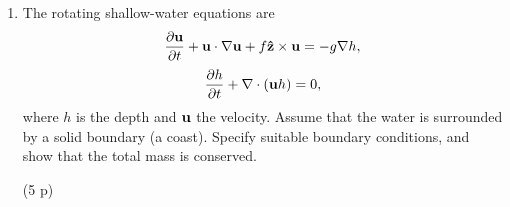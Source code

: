 \documentclass[12pt,a4paper]{article}
\newcommand{\bu}{{\bf u}}
\newcommand{\hz}{{\bf\hat{z}}}
\begin{document}
\begin{enumerate}
(10 p)\\
\item
The rotating shallow-water equations are
$$
\frac{\partial \bu}{\partial t}+\bu\cdot\nabla\bu+f\hz\times\bu
= -g\nabla h,
$$
$$
\frac{\partial h}{\partial t}+\nabla\cdot(\bu h) = 0,
$$
where $h$ is the depth and $\bu$ the velocity. Assume that the water is 
surrounded by a solid boundary (a coast). Specify suitable boundary conditions, 
and show that the total mass is conserved.

(5 p)\\
\end{enumerate}
\end{document}
